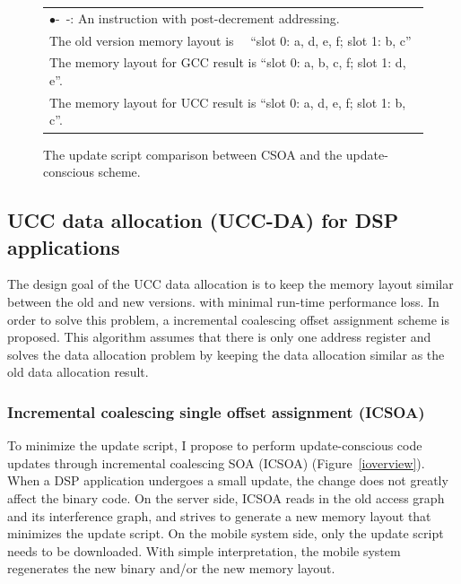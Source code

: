 \begin{figure}[htbp]
\begin{small}
\begin{center}
\begin{tabular}{|c|c||l||l|l||l|l|}
\multicolumn{7}{l}{$\bullet$-~-: An instruction with post-decrement addressing.}\\
\multicolumn{7}{l}{The old version memory layout is ~~``slot 0: a, d, e, f; slot 1: b, c''}\\
\multicolumn{7}{l}{The memory layout for GCC result is ``slot 0: a, b, c, f; slot 1: d, e''.}\\
\multicolumn{7}{l}{The memory layout for UCC result is ``slot 0: a, d, e, f; slot 1: b, c''.}
\end{tabular}
\end{center}
\end{small}
\caption{The update script comparison between CSOA and the update-conscious scheme.}
\vspace{-0.2in}
\label{recomdiff}
\end{figure}





\subsection{UCC data allocation (UCC-DA) for DSP applications}
The design goal of the UCC data allocation is to keep the memory layout similar between the old and new versions.
with minimal run-time performance loss.
In order to solve this problem, a incremental coalescing offset assignment scheme is proposed. This algorithm 
assumes that there is only one address register and solves the data allocation problem
by keeping the data allocation similar as the old data allocation result.


\subsubsection{Incremental coalescing single offset assignment (ICSOA)}


To minimize the update script, I propose to perform update-conscious code updates through incremental coalescing SOA (ICSOA) (Figure~\ref{ioverview}). When a DSP application undergoes a small update, the change does not greatly affect the binary code. On the server side, ICSOA reads in the old access graph and its interference graph, and strives to generate a new memory layout that minimizes the update script. On the mobile system side, only the update script needs to be downloaded. With simple interpretation, the mobile system  regenerates the new binary and/or the new memory layout.

